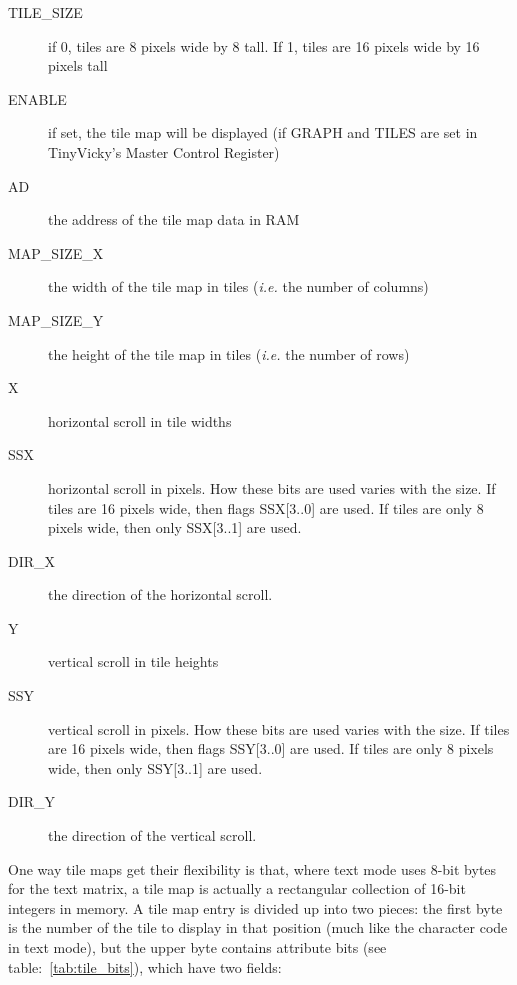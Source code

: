 \begin{description}
    \item[TILE\_SIZE] if 0, tiles are 8 pixels wide by 8 tall. If 1, tiles are 16 pixels wide by 16 pixels tall

    \item[ENABLE] if set, the tile map will be displayed (if GRAPH and TILES are set in TinyVicky's Master Control Register)

    \item[AD] the address of the tile map data in RAM

    \item[MAP\_SIZE\_X] the width of the tile map in tiles ({\it i.e.} the number of columns)

    \item[MAP\_SIZE\_Y] the height of the tile map in tiles ({\it i.e.} the number of rows)

    \item[X] horizontal scroll in tile widths

    \item[SSX] horizontal scroll in pixels. How these bits are used varies with the size. If tiles are 16 pixels wide, then flags SSX[3..0] are used. If tiles are only 8 pixels wide, then only SSX[3..1] are used.

    \item[DIR\_X] the direction of the horizontal scroll.

    \item[Y] vertical scroll in tile heights

    \item[SSY] vertical scroll in pixels. How these bits are used varies with the size. If tiles are 16 pixels wide, then flags SSY[3..0] are used. If tiles are only 8 pixels wide, then only SSY[3..1] are used.

    \item[DIR\_Y] the direction of the vertical scroll.

\end{description}

One way tile maps get their flexibility is that, where text mode uses 8-bit bytes for the text matrix, a tile map is actually a rectangular collection of 16-bit integers in memory. A tile map entry is divided up into two pieces: the first byte is the number of the tile to display in that position (much like the character code in text mode), but the upper byte contains attribute bits (see table:~\ref{tab:tile_bits}), which have two fields:


